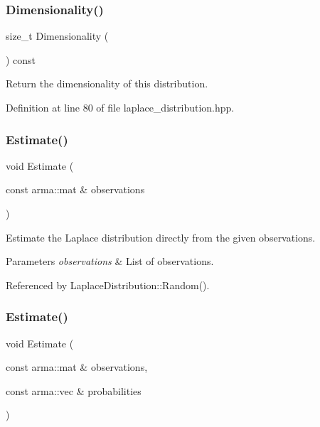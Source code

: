 \subsubsection{Dimensionality()}
{\footnotesize\ttfamily size\+\_\+t Dimensionality (\begin{DoxyParamCaption}{ }\end{DoxyParamCaption}) const\hspace{0.3cm}{\ttfamily [inline]}}



Return the dimensionality of this distribution. 



Definition at line 80 of file laplace\+\_\+distribution.\+hpp.

\mbox{\label{classmlpack_1_1distribution_1_1LaplaceDistribution_a8e4f3f3159adc7073194a9c71d5c6fc4}} 
\subsubsection{Estimate()\hspace{0.1cm}{\footnotesize\ttfamily [1/2]}}
{\footnotesize\ttfamily void Estimate (\begin{DoxyParamCaption}\item[{const arma\+::mat \&}]{observations }\end{DoxyParamCaption})}



Estimate the Laplace distribution directly from the given observations. 


\begin{DoxyParams}{Parameters}
{\em observations} & List of observations. \\
\hline
\end{DoxyParams}


Referenced by Laplace\+Distribution\+::\+Random().

\mbox{\label{classmlpack_1_1distribution_1_1LaplaceDistribution_a486d2a322d6bfd15f62127c5e25e20f0}} 
\subsubsection{Estimate()\hspace{0.1cm}{\footnotesize\ttfamily [2/2]}}
{\footnotesize\ttfamily void Estimate (\begin{DoxyParamCaption}\item[{const arma\+::mat \&}]{observations,  }\item[{const arma\+::vec \&}]{probabilities }\end{DoxyParamCaption})}



